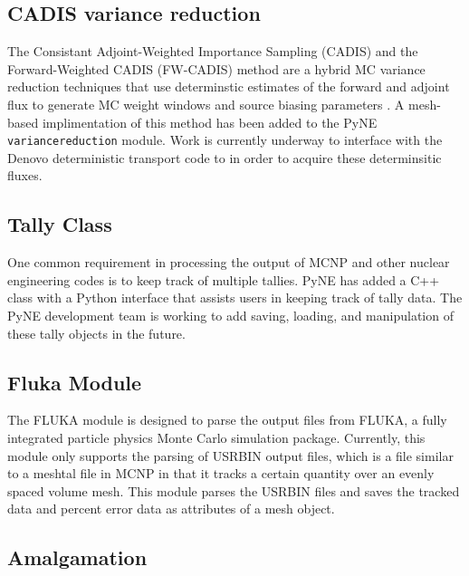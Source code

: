 \documentclass{anstrans}
\begin{document}

\subsection{CADIS variance reduction}

The Consistant Adjoint-Weighted Importance Sampling (CADIS) and the
Forward-Weighted CADIS (FW-CADIS) method are a hybrid MC variance reduction
techniques that use determinstic estimates of the forward and adjoint flux to
generate MC weight windows and source biasing parameters
\cite{haghighat_monte_2003}. A mesh-based implimentation of this method has
been added to the PyNE \texttt{variancereduction} module. Work is currently
underway to interface with the Denovo \cite{Denovo} deterministic transport
code to in order to acquire these determinsitic fluxes.


\subsection{Tally Class}

One common requirement in processing the output of MCNP and other nuclear
engineering codes is to keep track of multiple tallies. PyNE has added a
C++ class with a Python interface that assists users in keeping track of
tally data. The PyNE development team is working to add saving, loading,
and manipulation of these tally objects in the future.

\subsection{Fluka Module}

The FLUKA module is designed to parse the output files from FLUKA, a fully 
integrated particle physics Monte Carlo simulation package. Currently, 
this module only supports the parsing of USRBIN output files, which is 
a file similar to a meshtal file in MCNP in that it tracks a certain 
quantity over an evenly spaced volume mesh. This module parses the USRBIN 
files and saves the tracked data and percent error data as attributes of 
a mesh object.

\subsection{Amalgamation}
\end{document}
